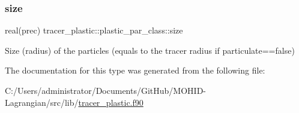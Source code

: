 \mbox{\label{structtracer__plastic_1_1plastic__par__class_ae7f5294e339ec13e0d5f0213fe66e026}} 
\subsubsection{\texorpdfstring{size}{size}}
{\footnotesize\ttfamily real(prec) tracer\+\_\+plastic\+::plastic\+\_\+par\+\_\+class\+::size\hspace{0.3cm}{\ttfamily [private]}}



Size (radius) of the particles (equals to the tracer radius if particulate==false) 



The documentation for this type was generated from the following file\+:\begin{DoxyCompactItemize}
\item 
C\+:/\+Users/administrator/\+Documents/\+Git\+Hub/\+M\+O\+H\+I\+D-\/\+Lagrangian/src/lib/\mbox{\hyperlink{tracer__plastic_8f90}{tracer\+\_\+plastic.\+f90}}\end{DoxyCompactItemize}
